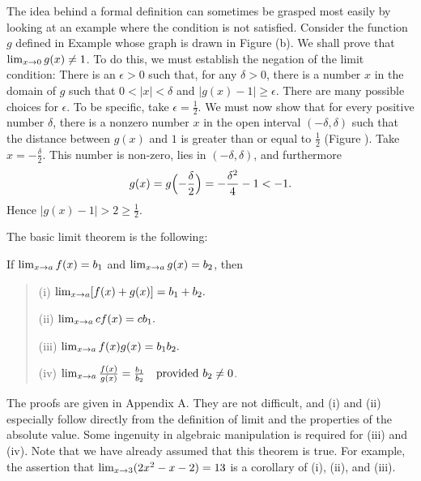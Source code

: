 \begin{example}\label{exam 1.4.4}
The idea behind a formal definition
can sometimes be grasped most easily
by looking at an example
where the condition is not satisfied.
Consider the function $g$
defined in Example 
whose graph is drawn in Figure (b).
We shall prove that
$\lim_{x \rightarrow 0} {g(x)} \neq 1$.
To do this,
we must establish the negation of the limit condition:
There is an $\epsilon > 0$
such that,
for any $\delta > 0$,
there is a number $x$ in the domain of $g$ such that
$0 < |x| < \delta$ and $|g(x) - 1| \geq \epsilon$.
There are many possible choices for $\epsilon$.
To be specific,
take $\epsilon = \frac{1}{2}$.
We must now show that for every positive number $\delta$, 
there is a nonzero number $x$ in the open interval
$(-\delta, \delta)$
such that the distance between $g(x)$ and $1$
is greater than or equal to $\frac{1}{2}$
(Figure ).
Take $x = -\frac{\delta}{2}$.
This number is non-zero,
lies in $(-\delta, \delta)$,
and furthermore  
\[
g(x) = g \Bigl( -\frac{\delta}{2} \Bigr) = -\frac{\delta^2}{4} - 1 < -1 .
\]
Hence $|g(x) - 1| > 2 \geq \frac{1}{2}$.
\end{example}

The basic limit theorem is the following:

\begin{prop}\label{thm 1.4.1}\label{thm blt}
If $\lim_{x \rightarrow a} f(x) = b_1$ and $\lim_{x \rightarrow a} g(x) = b_2$, then
\begin{quote}
{\rm (i)}
$\lim_{x \rightarrow a} [ f(x) + g(x) ] = b_1 + b_2.$  

{\rm (ii)}
$\lim_{x \rightarrow a} cf(x) = cb_1.$    

{\rm (iii)}
$\lim_{x \rightarrow a} f(x)g(x) = b_1b_2.$ 

{\rm (iv)}
$\lim_{x \rightarrow a} \frac{f(x)}{g(x)} = \frac{b_1}{b_2}
\quad \mbox{provided  $b_2 \neq 0$}$.
\end{quote}
\end{prop} 

The proofs are given in Appendix A.
They are not difficult,
and (i) and (ii) especially follow directly from
the definition of limit and the properties of the absolute value.
Some ingenuity in algebraic manipulation is required for (iii) and (iv).
Note that we have already assumed that this theorem is true.
For example,
the assertion that $\lim_{x \rightarrow 3} (2x^2 - x - 2) = 13$
is a corollary of (i), (ii), and (iii).


